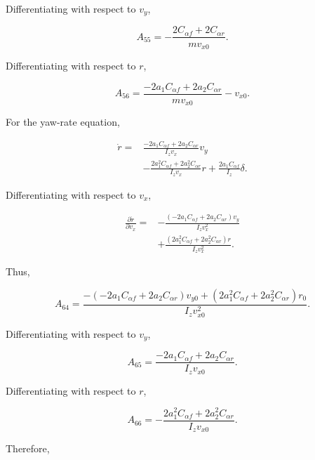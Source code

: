 \documentclass[12pt,a4paper]{article}
\begin{document}
Differentiating with respect to $v_y$,

\begin{equation}
\boxed{
A_{55}
=
-\frac{
2C_{\alpha f}+2C_{\alpha r}
}
{mv_{x0}}
}.
\end{equation}

Differentiating with respect to $r$,

\begin{equation}
\boxed{
A_{56}
=
\frac{
-2a_1C_{\alpha f}
+
2a_2C_{\alpha r}
}
{mv_{x0}}
-v_{x0}
}.
\end{equation}

For the yaw-rate equation,

\begin{align}
\dot r
={}&
\frac{
-2a_1C_{\alpha f}
+
2a_2C_{\alpha r}
}
{I_zv_x}v_y
\nonumber\\
&-
\frac{
2a_1^2C_{\alpha f}
+
2a_2^2C_{\alpha r}
}
{I_zv_x}r
+
\frac{2a_1C_{\alpha f}}{I_z}\delta.
\end{align}

Differentiating with respect to $v_x$,

\begin{align}
\frac{\partial\dot r}{\partial v_x}
={}&
-\frac{
(-2a_1C_{\alpha f}+2a_2C_{\alpha r})v_y
}
{I_zv_x^2}
\nonumber\\
&+
\frac{
(2a_1^2C_{\alpha f}+2a_2^2C_{\alpha r})r
}
{I_zv_x^2}.
\end{align}

Thus,

\begin{equation}
\boxed{
A_{64}
=
\frac{
-(-2a_1C_{\alpha f}+2a_2C_{\alpha r})v_{y0}
+
(2a_1^2C_{\alpha f}+2a_2^2C_{\alpha r})r_0
}
{I_zv_{x0}^2}
}.
\end{equation}

Differentiating with respect to $v_y$,

\begin{equation}
\boxed{
A_{65}
=
\frac{
-2a_1C_{\alpha f}
+
2a_2C_{\alpha r}
}
{I_zv_{x0}}
}.
\end{equation}

Differentiating with respect to $r$,

\begin{equation}
\boxed{
A_{66}
=
-\frac{
2a_1^2C_{\alpha f}
+
2a_2^2C_{\alpha r}
}
{I_zv_{x0}}
}.
\end{equation}

Therefore,
\end{document}
